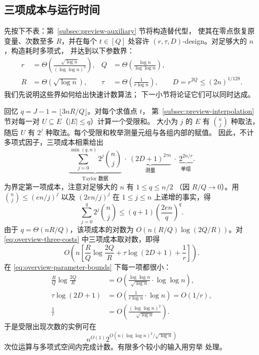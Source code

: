 \subsection{三项成本与运行时间}
\label{subsec:preview-parameters}
先按下不表：第~\ref{subsec:preview-auxiliary} 节将构造替代型，
使其在零点恢复原变量、次数至多 $R$，并在每个 $t\in[Q]$
处容许 $(r,\tau,D)$-design。对足够大的 $n$，构造耗时多项式，
并达到以下参数界：
\begin{equation}\label{eq:overview-parameter-bounds}
 \begin{aligned}
 r&=\Theta\!\left(\frac{\sqrt{\log n}}{(\log\log n)^2}\right),
 &Q&=\Theta\!\left(\frac{\log n}{\log\log n}\right),\\
 R&=\Theta(\sqrt{\log n}),
 &\tau&=\Theta\!\left(\frac1{r\log n}\right),\qquad
 D=r^{2Q}\le(2n)^{1/128}.
 \end{aligned}
\end{equation}
我们先说明这些界如何给出快速计数算法；
下一小节将论证它们可以同时达成。

回忆 $q=J-1=\lfloor3nR/Q\rfloor$。对每个求值点 $t$，
第~\ref{subsec:preview-interpolation} 节对每一对
$U\subseteq E$（$|E|\le q$）计算一个受限和。
大小为 $j$ 的 $E$ 有 $\binom nj$ 种取法，随后 $U$ 有 $2^j$
种取法。每个受限和枚举测量元组与各组内部的赋值。
因此，不计多项式因子，三项成本相乘给出
\begin{equation}\label{eq:overview-three-costs}
 \underbrace{\sum_{j=0}^{\min(q,n)}2^j\binom nj}_{\text{Taylor 数据}}
 \ \cdot\
 \underbrace{(2D+1)^{2\tau n}}_{\text{测量}}
 \ \cdot\
 \underbrace{2^{2n/r}}_{\text{单组}}.
\end{equation}
为界定第一项成本，注意对足够大的 $n$ 有 $1\le q\le n/2$
（因 $R/Q\to0$）。用 $\binom nj\le(en/j)^j$ 以及
$(2en/j)^j$ 在 $1\le j\le n$ 上递增的事实，得
\[
 \sum_{j=0}^q2^j\binom nj
 \le(q+1)\left(\frac{2en}{q}\right)^q.
\]
由于 $q=\Theta(nR/Q)$，该项成本的对数为
$O(n(R/Q)\log(2Q/R))$。对 \eqref{eq:overview-three-costs}
中三项成本取对数，即得
\[
 O\!\left(n\left[
       \frac RQ\log\frac{2Q}{R}
       +\tau\log(2D+1)+\frac1r\right]\right).
\]
在 \eqref{eq:overview-parameter-bounds} 下每一项都很小：
\[
 \begin{aligned}
 \frac RQ\log\frac{2Q}{R}
   &=O\!\left(\frac{\log\log n}{\sqrt{\log n}}
                      \cdot\log\log n\right),\\
 \tau\log(2D+1)&=O\!\left(\frac1{r\log n}\cdot\log n\right)
                  =O(1/r),\\
 \frac1r&=O\!\left(\frac{(\log\log n)^2}{\sqrt{\log n}}\right).
 \end{aligned}
\]
于是受限出现次数的实例可在
\begin{equation}\label{eq:overview-bounded-time}
 n^{O(1)}2^{O(n(\log\log n)^2/\sqrt{\log n})}
\end{equation}
次位运算与多项式空间内完成计数。有限多个较小的输入用穷举
处理。

